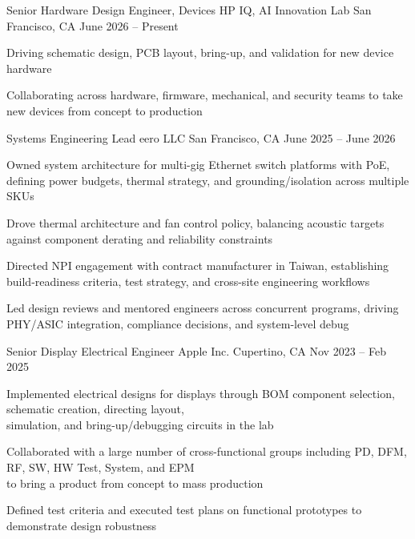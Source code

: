 \documentclass[]{awesome-cv}
\begin{document}
\begin{cventries}
	\cventry
	  {Senior Hardware Design Engineer, Devices}
	  {HP IQ, AI Innovation Lab}
	  {San Francisco, CA}
	  {June 2026 – Present}
	  {
	    \begin{cvitems}
	      \item {Driving schematic design, PCB layout, bring-up, and validation for new device hardware}
	      \item {Collaborating across hardware, firmware, mechanical, and security teams to take new devices from concept to production}
	    \end{cvitems}
	  }
	\cventry
	  {Systems Engineering Lead}
	  {eero LLC}
	  {San Francisco, CA}
	  {June 2025 – June 2026}
	  {
	    \begin{cvitems}
	      \item {Owned system architecture for multi-gig Ethernet switch platforms with PoE, defining power budgets, thermal strategy, \hfill \break and grounding/isolation across multiple SKUs}
	      \item {Drove thermal architecture and fan control policy, balancing acoustic targets against component derating \hfill \break and reliability constraints}
	      \item {Directed NPI engagement with contract manufacturer in Taiwan, establishing build-readiness criteria, test strategy, \hfill \break and cross-site engineering workflows}
	      \item {Led design reviews and mentored engineers across concurrent programs, driving PHY/ASIC integration, \hfill \break compliance decisions, and system-level debug}
	    \end{cvitems}
	  }
	\cventry
	{Senior Display Electrical Engineer}
	{Apple Inc.}
	{Cupertino, CA}
	{Nov 2023 – Feb 2025}
	{\begin{cvitems}
  \item {Implemented electrical designs for displays through BOM component selection, schematic creation, directing layout, \\
     simulation, and bring-up/debugging circuits in the lab}
  \item {Collaborated with a large number of cross-functional groups including PD, DFM, RF, SW, HW Test, System, and EPM \\
     to bring a product from concept to mass production}
  \item {Defined test criteria and executed test plans on functional prototypes to demonstrate design robustness}

\end{cvitems}}
\end{cventries}
\end{document}
